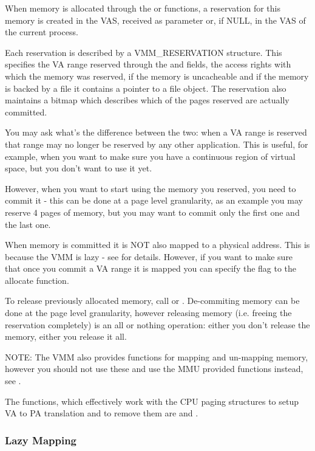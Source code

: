 \begin{appendices}
When memory is allocated through the  or  functions, a
reservation for this memory is created in the VAS, received as parameter or, if NULL, in the VAS of
the current process.

Each reservation is described by a VMM\_RESERVATION structure. This specifies the VA range reserved
through the  and  fields, the access rights with which the memory was
reserved, if the memory is uncacheable and if the memory is backed by a file it contains a pointer
to a file object. The reservation also maintains a bitmap which describes which of the pages reserved
are actually committed.

You may ask what's the difference between the two: when a VA range is reserved that range may no
longer be reserved by any other application. This is useful, for example, when you want to make sure
you have a continuous region of virtual space, but you don't want to use it yet.

However, when you want to start using the memory you reserved, you need to commit it - this can be
done at a page level granularity, as an example you may reserve 4 pages of memory, but you may want 
to commit only the first one and the last one.

When memory is committed it is NOT also mapped to a physical address. This is because the VMM is
lazy - see  for details. However, if you want to make sure that once you 
commit a VA range it is mapped you can specify the  flag
to the allocate function.

To release previously allocated memory, call  or . De-commiting
memory can be done at the page level granularity, however releasing memory (i.e. freeing the 
reservation completely) is an all or nothing operation: either you don't release the memory, either
you release it all.

NOTE: The VMM also provides functions for mapping and un-mapping memory, however you should not use
these and use the MMU provided functions instead, see .

The functions, which effectively work with the CPU paging structures to setup VA to PA translation
and to remove them are  and .

\subsubsection{Lazy Mapping}
\label{sect:LazyMapping}


\end{appendices}
